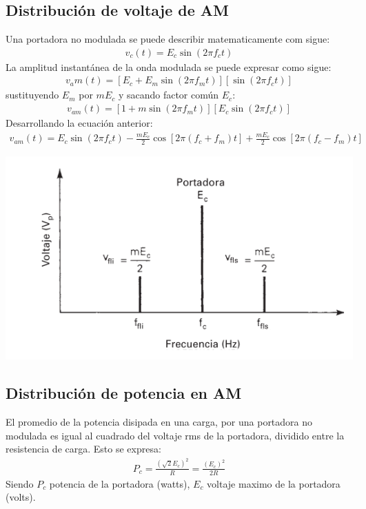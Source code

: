 \documentclass[10pt,a4paper]{article}
\begin{document}
	\subsection{Distribución de voltaje de AM}
	Una portadora no modulada se puede describir matematicamente com sigue:
	\begin{align}
		v_c(t)=E_c \sin(2\pi f_c t)
	\end{align}
	La amplitud instantánea de la onda modulada se puede expresar como sigue:
	\begin{align}
		v_am(t)=[E_c+E_m \sin (2\pi f_m t)][\sin(2\pi f_c t)]
	\end{align}
	sustituyendo $E_m$ por $mE_c$ y sacando factor común $E_c$:
		\begin{align}
		v_{am}(t)=[1+m\sin(2\pi f_m t)][E_c\sin(2\pi f_c t)]
	\end{align}	
	Desarrollando la ecuación anterior:
	\begin{align}
		v_{am}(t)=E_c\sin(2\pi f_c t)-\frac{mE_c}{2}\cos[2\pi(f_c+f_m)t]+\frac{mE_c}{2}\cos[2\pi(f_c-f_m)t]
	\end{align}
	\begin{center}
		\includegraphics[scale=0.5]{screenshot002}
	\end{center}
	\subsection{Distribución de potencia en AM}
	El promedio de la potencia disipada en una carga, por una portadora no modulada es igual al cuadrado del voltaje rms de la portadora, dividido entre la resistencia de carga. Esto se expresa:
	\begin{align}
		P_c=\frac{(\sqrt{2}E_c)^2}{R}=\frac{(E_c)^2}{2R}
	\end{align}
	Siendo $P_c$ potencia de la portadora (watts), $E_c$ voltaje maximo de la portadora (volts).
	
\end{document}
